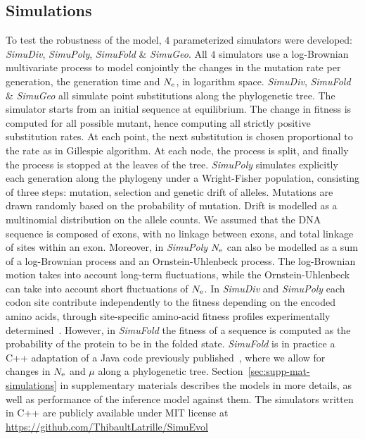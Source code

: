 \subsection{Simulations}
\label{sec:Simulation}
To test the robustness of the model, $4$ parameterized simulators were developed: \textit{SimuDiv}, \textit{SimuPoly}, \textit{SimuFold} \& \textit{SimuGeo}.
All $4$ simulators use a log-Brownian multivariate process to model conjointly the changes in the mutation rate per generation, the generation time and $N_{\mathrm{e}}$, in logarithm space.
\textit{SimuDiv}, \textit{SimuFold} \& \textit{SimuGeo} all simulate point substitutions along the phylogenetic tree.
The simulator starts from an initial sequence at equilibrium.
The change in fitness is computed for all possible mutant, hence computing all strictly positive substitution rates.
At each point, the next substitution is chosen proportional to the rate as in Gillespie algorithm.
At each node, the process is split, and finally the process is stopped at the leaves of the tree.
\textit{SimuPoly} simulates explicitly each generation along the phylogeny under a Wright-Fisher population, consisting of three steps: mutation, selection and genetic drift of alleles.
Mutations are drawn randomly based on the probability of mutation.
Drift is modelled as a multinomial distribution on the allele counts.
We assumed that the \acrshort{DNA} sequence is composed of exons, with no linkage between exons, and total linkage of sites within an exon.
Moreover, in \textit{SimuPoly} $N_{\mathrm{e}}$ can also be modelled as a sum of a log-Brownian process and an Ornstein-Uhlenbeck process.
The log-Brownian motion takes into account long-term fluctuations, while the Ornstein-Uhlenbeck can take into account short fluctuations of $N_{\mathrm{e}}$.
In \textit{SimuDiv} and \textit{SimuPoly} each codon site contribute independently to the fitness depending on the encoded amino acids, through site-specific amino-acid fitness profiles experimentally determined~\citep{Bloom2017}.
However, in \textit{SimuFold} the fitness of a sequence is computed as the probability of the protein to be in the folded state.
\textit{SimuFold} is in practice a C++ adaptation of a Java code previously published~\citep{Goldstein2016, Goldstein2017}, where we allow for changes in $N_{\mathrm{e}}$ and $\mu$ along a phylogenetic tree.
Section~\ref{sec:supp-mat-simulations} in supplementary materials describes the models in more details, as well as performance of the inference model against them.
The simulators written in C++ are publicly available under MIT license at \url{https://github.com/ThibaultLatrille/SimuEvol}
